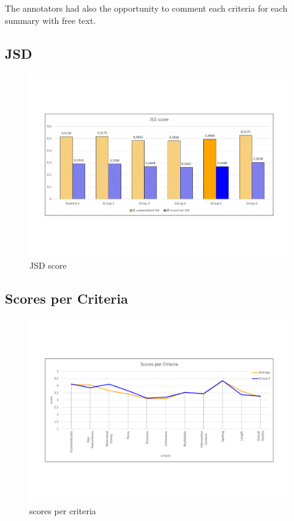The annotators had also the opportunity to comment each criteria for each summary with free text.

\subsection{JSD}

\begin{figure}[H]
	\centering
	\includegraphics[trim= 0 150 0 150,width=\textwidth]{img/jsd.pdf}
	\caption{JSD score}
	\label{fig:jsd}
\end{figure}


\subsection{Scores per Criteria}

\begin{figure}[H]
	\centering
	\includegraphics[trim= 0 150 0 150,width=\textwidth]{img/scores_per_criteria.pdf}
	\caption{scores per criteria}
	\label{fig:spc}
\end{figure}

